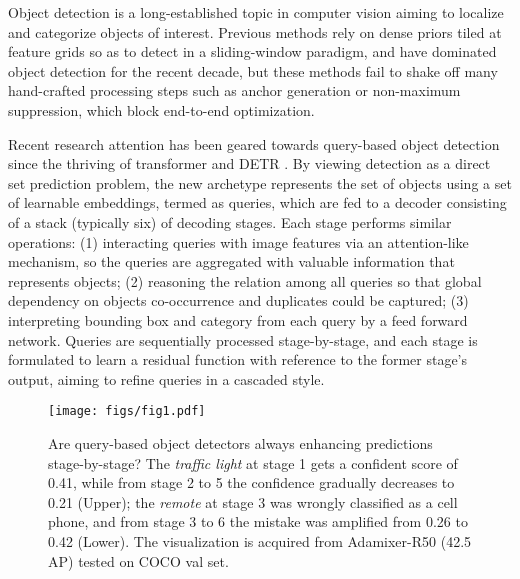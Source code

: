 \documentclass[10pt,twocolumn,letterpaper]{article}
\begin{document}
Object detection is a long-established topic in computer vision aiming to localize and categorize objects of interest. Previous methods \cite{Girshick2014RichFH, Girshick2015FastR, Ren2015FasterRT, Liu2016SSDSS, Redmon2016YouOL, haibao1, haibao2, Lin2017FocalLF, Zhu2020SoftAO, Chen2020NCMSTA, Zhang2020BridgingTG, Tian2019FCOSFC, Kong2019FoveaBoxBA, Zhang2021VarifocalNetAI, feng2021tood} rely on dense priors tiled at feature grids so as to detect in a sliding-window paradigm, and have dominated object detection for the recent decade, but these methods fail to shake off many hand-crafted processing steps such as anchor generation or non-maximum suppression, which block end-to-end optimization.

Recent research attention has been geared towards query-based object detection \cite{Carion2020EndtoEndOD, Liu2022DABDETRDA, Meng2021ConditionalDF, Wang2022AnchorDQ, Zhu2021DeformableDD, Li2022DNDETRAD, Sun2021SparseRE} since the thriving of transformer \cite{Vaswani2017AttentionIA} and DETR \cite{Carion2020EndtoEndOD}. By viewing detection as a direct set prediction problem, the new archetype represents the set of objects using a set of learnable embeddings, termed as queries, which are fed to a decoder consisting of a stack (typically six) of decoding stages. Each stage performs similar operations: (1) interacting queries with image features via an attention-like mechanism, so the queries are aggregated with valuable information that represents objects; (2) reasoning the relation among all queries so that global dependency on objects co-occurrence and duplicates could be captured; (3) interpreting bounding box and category from each query by a feed forward network. Queries are sequentially processed stage-by-stage, and each stage is formulated to learn a residual function with reference to the former stage's output, aiming to refine queries in a cascaded style.

\begin{figure*}[t]
    \centering
    \texttt{[image: figs/fig1.pdf]}
    \caption{Are query-based object detectors always enhancing predictions stage-by-stage? The \emph{traffic light} at stage 1 gets a confident score of 0.41, while from stage 2 to 5 the confidence gradually decreases to 0.21 (Upper); the \emph{remote} at stage 3 was wrongly classified as a cell phone, and from stage 3 to 6 the mistake was amplified from 0.26 to 0.42 (Lower). The visualization is acquired from Adamixer-R50 (42.5 AP) tested on COCO val set.}
    \label{fig:fig1}
\end{figure*}
\end{document}

